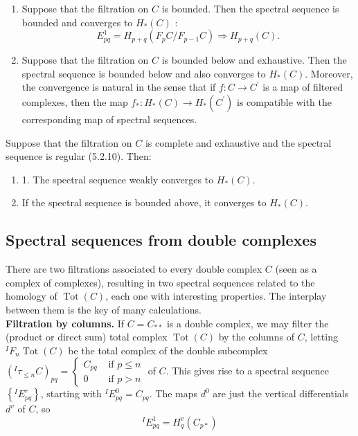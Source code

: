 \begin{theo}
\begin{enumerate}
    \item Suppose that the filtration on $C$ is bounded. Then the spectral sequence is bounded and converges to $H_*(C)$ :
    $$
    E_{p q}^1=H_{p+q}\left(F_p C / F_{p-1} C\right) \Rightarrow H_{p+q}(C) .
    $$
    \item Suppose that the filtration on $C$ is bounded below and exhaustive. Then the spectral sequence is bounded below and also converges to $H_*(C)$.
    Moreover, the convergence is natural in the sense that if $f: C \rightarrow C^{\prime}$ is a map of filtered complexes, then the map $f_*: H_*(C) \rightarrow H_*\left(C^{\prime}\right)$ is compatible with the corresponding map of spectral sequences.
\end{enumerate}   
\end{theo}



\begin{theo}
Suppose that the filtration on $C$ is complete and exhaustive and the spectral sequence is regular (5.2.10). Then:
\begin{enumerate}
    \item 1. The spectral sequence weakly converges to $H_*(C)$.
    \item If the spectral sequence is bounded above, it converges to $H_*(C)$.
\end{enumerate}
\end{theo}

\subsection{Spectral sequences from double complexes}
There are two filtrations associated to every double complex $C$ (seen as a complex of complexes), resulting in two spectral sequences related to the homology of $\operatorname{Tot}(C)$, each one with interesting properties. The interplay between them is the key of many calculations.\\ %


\textbf{Filtration by columns.} If $C=C_{* *}$ is a double complex, we may filter the (product or direct sum) total complex $\operatorname{Tot}(C)$ by the columns of $C$, letting ${ }^I F_n \operatorname{Tot}(C)$ be the total complex of the double subcomplex $\left({ }^I \tau_{\leq n} C\right)_{p q}= \begin{cases}C_{p q} & \text { if } p \leq n \\ 0 & \text { if } p>n\end{cases}$ of $C$. This gives rise to a spectral sequence $\left\{{ }^I E_{p q}^r\right\}$, starting with ${ }^I E_{p q}^0=C_{p q}$. The maps $d^0$ are just the vertical differentials $d^v$ of $C$, so
$$
{ }^I E_{p q}^1=H_q^v\left(C_{p *}\right)
$$

